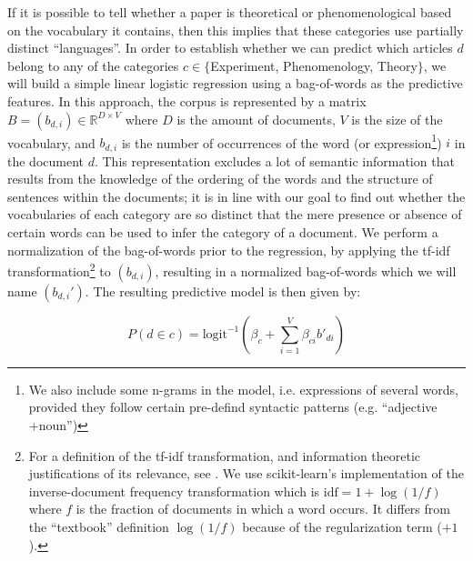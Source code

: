 \documentclass[smallextended]{svjour3}
\begin{document}
If it is possible to tell whether a paper is theoretical or phenomenological based on the vocabulary it contains, then this implies that these categories use partially distinct ``languages''. In order to establish whether we can predict which articles $d$ belong to any of the categories $c \in \{$Experiment, Phenomenology, Theory$\}$, we will build a simple linear logistic regression using a bag-of-words as the predictive features. In this approach, the corpus is represented by a matrix $B=(b_{d,i}) \in \mathbb{R}^{D\times V}$ where $D$ is the amount of documents, $V$ is the size of the vocabulary, and $b_{d,i}$ is the number of occurrences of the word (or expression\footnote{We also include some n-grams in the model, i.e. expressions of several words, provided they follow certain pre-defind syntactic patterns (e.g. ``adjective +noun'')}) $i$ in the document $d$. This representation excludes a lot of semantic information that results from the knowledge of the ordering of the words and the structure of sentences within the documents; it is in line with our goal to find out whether the vocabularies of each category are so distinct that the mere presence or absence of certain words can be used to infer the category of a document. We perform a normalization of the bag-of-words prior to the regression, by applying the tf-idf transformation\footnote{For a definition of the tf-idf transformation, and information theoretic justifications of its relevance, see \citealt{Beel2015_tfidf_uses,Robertson2004_tfidf_justification}. We use scikit-learn's implementation of the inverse-document frequency transformation which is $\text{idf} = 1+\log(1/f)$ where $f$ is the fraction of documents in which a word occurs. It differs from the ``textbook'' definition $\log(1/f)$ because of the regularization term ($+1$).} to $(b_{d,i})$, resulting in a normalized bag-of-words which we will name $(b_{d,i}')$. The resulting predictive model is then given by:

\begin{equation}
    \label{eq:logistic_bow_classifier}
    P(d\in c) = \mathrm{logit}^{-1}\left(\beta_c + \sum_{i=1}^V \beta_{ci} b'_{di}  \right)
\end{equation}
\end{document}
